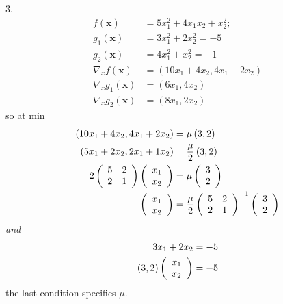 \documentclass[aps,preprint]{revtex4}%
\begin{document}
3.
\begin{align*}
f\left(  \boldsymbol{x}\right)   &  =5x_{1}^{2}+4x_{1}x_{2}+x_{2}^{2};\\
g_{1}\left(  \boldsymbol{x}\right)   &  =3x_{1}^{2}+2x_{2}^{2}=-5\\
g_{2}\left(  \boldsymbol{x}\right)   &  =4x_{1}^{2}+x_{2}^{2}=-1\\
\nabla_{x}f\left(  \boldsymbol{x}\right)   &  =\left(  10x_{1}+4x_{2}%
,4x_{1}+2x_{2}\right) \\
\nabla_{x}g_{1}\left(  \boldsymbol{x}\right)   &  =\left(  6x_{1}%
,4x_{2}\right) \\
\nabla_{x}g_{2}\left(  \boldsymbol{x}\right)   &  =\left(  8x_{1}%
,2x_{2}\right)
\end{align*}
so at min
\begin{align*}
\left(  10x_{1}+4x_{2},4x_{1}+2x_{2}\right)   &  =\mu\left(  3,2\right) \\
\left(  5x_{1}+2x_{2},2x_{1}+1x_{2}\right)   &  =\frac{\mu}{2}\left(
3,2\right) \\
2\left(
\begin{array}
[c]{cc}%
5 & 2\\
2 & 1
\end{array}
\right)  \left(
\begin{array}
[c]{c}%
x_{1}\\
x_{2}%
\end{array}
\right)   &  =\mu\left(
\begin{array}
[c]{c}%
3\\
2
\end{array}
\right) \\
\left(
\begin{array}
[c]{c}%
x_{1}\\
x_{2}%
\end{array}
\right)   &  =\frac{\mu}{2}\left(
\begin{array}
[c]{cc}%
5 & 2\\
2 & 1
\end{array}
\right)  ^{-1}\left(
\begin{array}
[c]{c}%
3\\
2
\end{array}
\right)
\end{align*}
\emph{and}
\begin{align*}
3x_{1}+2x_{2}  &  =-5\\
\left(  3,2\right)  \left(
\begin{array}
[c]{c}%
x_{1}\\
x_{2}%
\end{array}
\right)   &  =-5
\end{align*}
the last condition specifies $\mu$.
\end{document}
